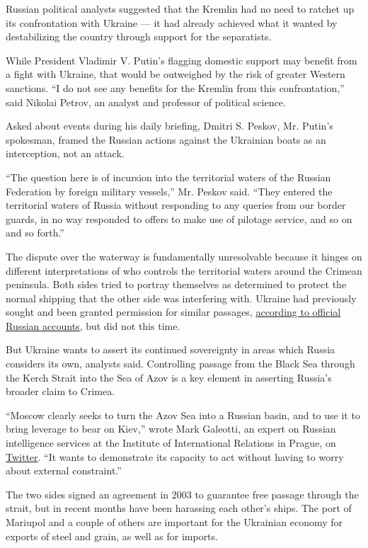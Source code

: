 Russian political analysts suggested that the Kremlin had no need to
ratchet up its confrontation with Ukraine --- it had already achieved
what it wanted by destabilizing the country through support for the
separatists.

While President Vladimir V. Putin's flagging domestic support may
benefit from a fight with Ukraine, that would be outweighed by the risk
of greater Western sanctions. ``I do not see any benefits for the
Kremlin from this confrontation,'' said Nikolai Petrov, an analyst and
professor of political science.

Asked about events during his daily briefing, Dmitri S. Peskov, Mr.
Putin's spokesman, framed the Russian actions against the Ukrainian
boats as an interception, not an attack.

``The question here is of incursion into the territorial waters of the
Russian Federation by foreign military vessels,'' Mr. Peskov said.
``They entered the territorial waters of Russia without responding to
any queries from our border guards, in no way responded to offers to
make use of pilotage service, and so on and so forth.''

The dispute over the waterway is fundamentally unresolvable because it
hinges on different interpretations of who controls the territorial
waters around the Crimean peninsula. Both sides tried to portray
themselves as determined to protect the normal shipping that the other
side was interfering with. Ukraine had previously sought and been
granted permission for similar passages,
\href{http://www.fsb.ru/fsb/press/message/single.htm\%21id\%3D10438315\%40fsbMessage.html}{according
to official Russian accounts,} but did not this time.

But Ukraine wants to assert its continued sovereignty in areas which
Russia considers its own, analysts said. Controlling passage from the
Black Sea through the Kerch Strait into the Sea of Azov is a key element
in asserting Russia's broader claim to Crimea.

``Moscow clearly seeks to turn the Azov Sea into a Russian basin, and to
use it to bring leverage to bear on Kiev,'' wrote Mark Galeotti, an
expert on Russian intelligence services at the Institute of
International Relations in Prague, on
\href{https://twitter.com/MarkGaleotti/status/1067059451679703040}{Twitter}.
``It wants to demonstrate its capacity to act without having to worry
about external constraint.''

The two sides signed an agreement in 2003 to guarantee free passage
through the strait, but in recent months have been harassing each
other's ships. The port of Mariupol and a couple of others are important
for the Ukrainian economy for exports of steel and grain, as well as for
imports.


